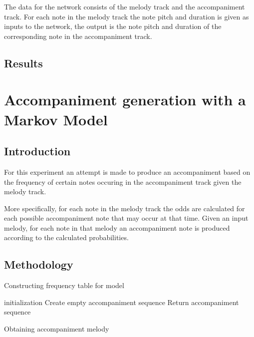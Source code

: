 The data for the network consists of the melody track and the accompaniment track. For each note in the melody track the note pitch and duration is given as inputs to the network, the output is the note pitch and duration of the corresponding note in the accompaniment track.

\section{Results}

\chapter{Accompaniment generation with a Markov Model}
\section{Introduction}
For this experiment an attempt is made to produce an accompaniment based on the frequency of certain notes occuring in the accompaniment track given the melody track.

More specifically, for each note in the melody track the odds are calculated for each possible accompaniment note that may occur at that time. Given an input melody, for each note in that melody an accompaniment note is produced according to the calculated probabilities.

\section{Methodology}
\begin{algorithm}
 \caption{Constructing frequency table for model}
\end{algorithm}

\begin{algorithm}
 initialization\;
 Create empty accompaniment sequence\;
 Return accompaniment sequence\;
 \caption{Obtaining accompaniment melody}
\end{algorithm}


